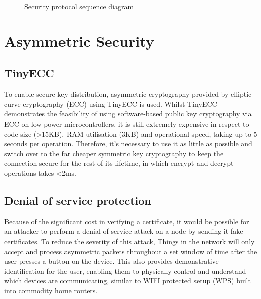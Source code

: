 \documentclass[conference]{./sty/IEEEtran}
\begin{document}
\begin{figure}[h!]
\begin{center}

\caption{Security protocol sequence diagram}
\label{fig:sequence_diagram}
\end{center}
\end{figure}

\section{Asymmetric Security} %
\label{sec:asymmetric_security}
\subsection{TinyECC} %
\label{sub:tinyecc}
To enable secure key distribution, asymmetric cryptography provided by elliptic curve cryptography (ECC) using TinyECC\cite{TinyECC} is used. Whilst TinyECC demonstrates the feasibility of using software-based public key cryptography via ECC on low-power microcontrollers, it is still extremely expensive in respect to code size (\textgreater15KB), RAM utilisation (3KB) and operational speed, taking up to 5 seconds per operation. Therefore, it's necessary to use it as little as possible and switch over to the far cheaper symmetric key cryptography to keep the connection secure for the rest of its lifetime, in which encrypt and decrypt operations takes \textless 2ms.

\subsection{Denial of service protection} %
\label{sub:denial_of_service_protection}
Because of the significant cost in verifying a certificate, it would be possible for an attacker to perform a denial of service attack on a node by sending it fake certificates. To reduce the severity of this attack, Things in the network will only accept and process asymmetric packets throughout a set window of time after the user presses a button on the device. This also provides demonstrative identification for the user, enabling them to physically control and understand which devices are communicating, similar to WIFI protected setup (WPS) built into commodity home routers.
\end{document}
